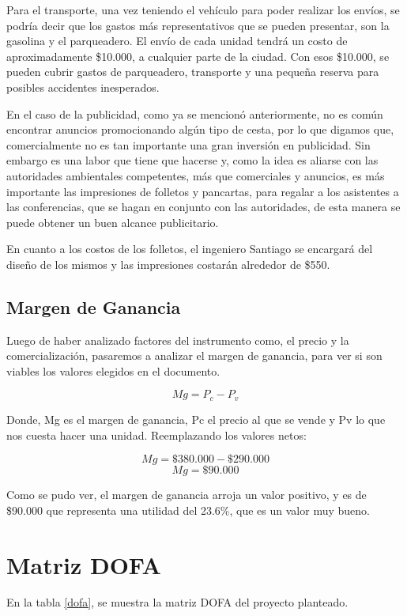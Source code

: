 \documentclass[letterpaper,12pt]{scrreprt}
\begin{document}
    Para el transporte, una vez teniendo el vehículo para poder realizar los envíos, se podría decir que los gastos más representativos que se pueden presentar, son la gasolina y el parqueadero. El envío de cada unidad tendrá un costo de aproximadamente \$10.000, a cualquier parte de la ciudad. Con esos \$10.000, se pueden cubrir gastos de parqueadero, transporte y una pequeña reserva para posibles accidentes inesperados.

    En el caso de la publicidad, como ya se mencionó anteriormente, no es común encontrar anuncios promocionando algún tipo de cesta, por lo que digamos que, comercialmente no es tan importante una gran inversión en publicidad. Sin embargo es una labor que tiene que hacerse y, como la idea es aliarse con las autoridades ambientales competentes, más que comerciales  y anuncios, es más importante las impresiones de folletos y pancartas, para regalar a los asistentes a las conferencias, que se hagan en conjunto con las autoridades, de esta manera se puede obtener un buen alcance publicitario.

    En cuanto a los costos de los folletos, el ingeniero Santiago se encargará del diseño de los mismos y las impresiones costarán alrededor de \$550.

    \section{Margen de Ganancia}
    Luego de haber analizado factores del instrumento como, el precio y la comercialización, pasaremos a analizar el margen de ganancia, para ver si son viables los valores elegidos en el documento.

    \[Mg = P_{c} - P_{v}\]

    Donde, Mg es el margen de ganancia, Pc el precio al que se vende y Pv lo que nos cuesta hacer una unidad. Reemplazando los valores netos:

    \[Mg = \$ 380.000 - \$ 290.000\]
    \[Mg = \$ 90.000\]

    Como se pudo ver, el margen de ganancia arroja un valor positivo, y es de \$90.000 que representa una utilidad del 23.6\%, que es un valor muy bueno.
\chapter{Matriz DOFA}

En la tabla \ref{dofa}, se muestra la matriz DOFA del proyecto planteado. 
\end{document}
